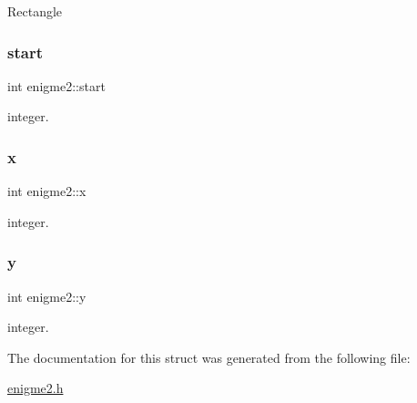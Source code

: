Rectangle \mbox{\label{structenigme2_a46fc61f86e8d3f8a331a221985058b82}} 
\subsubsection{\texorpdfstring{start}{start}}
{\footnotesize\ttfamily int enigme2\+::start}

integer. \mbox{\label{structenigme2_a422d435047e30ae7577a8e238f61668e}} 
\subsubsection{\texorpdfstring{x}{x}}
{\footnotesize\ttfamily int enigme2\+::x}

integer. \mbox{\label{structenigme2_aac3138bd43564620b75c50bf20125fca}} 
\subsubsection{\texorpdfstring{y}{y}}
{\footnotesize\ttfamily int enigme2\+::y}

integer. 

The documentation for this struct was generated from the following file\+:\begin{DoxyCompactItemize}
\item 
\hyperlink{enigme2_8h}{enigme2.\+h}\end{DoxyCompactItemize}
